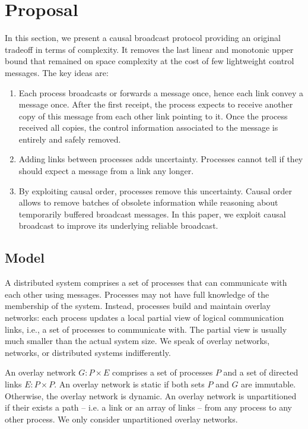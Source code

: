 
\section{Proposal}
\label{sec:proposal}

In this section, we present a causal broadcast protocol providing an original
tradeoff in terms of complexity. It removes the last linear and monotonic upper
bound that remained on space complexity at the cost of few lightweight control
messages. The key ideas are:
\begin{enumerate}
\item Each process broadcasts or forwards a message once, hence each link convey
  a message once. After the first receipt, the process expects to receive
  another copy of this message from each other link pointing to it. Once the
  process received all copies, the control information associated to the message
  is entirely and safely removed.
\item Adding links between processes adds uncertainty. Processes cannot tell if
  they should expect a message from a link any longer.
\item By exploiting causal order, processes remove this uncertainty. Causal
  order allows to remove batches of obsolete information while reasoning about
  temporarily buffered broadcast messages. In this paper, we exploit causal
  broadcast to improve its underlying reliable broadcast.
\end{enumerate}

\subsection{Model}

A distributed system comprises a set of processes that can communicate with each
other using messages. Processes may not have full knowledge of the membership of
the system. Instead, processes build and maintain overlay networks: each process
updates a local partial view of logical communication links, i.e., a set of
processes to communicate with. The partial view is usually much smaller than the
actual system size. We speak of overlay networks, networks, or distributed
systems indifferently.

\begin{definition}
  An overlay network $G: P \times E$ comprises a set of processes $P$ and a set
  of directed links $E: P \times P$.  An overlay network is static if both sets
  $P$ and $G$ are immutable. Otherwise, the overlay network is dynamic. An
  overlay network is unpartitioned if their exists a path -- i.e. a link or an
  array of links -- from any process to any other process. We only consider
  unpartitioned overlay networks.
\end{definition}

